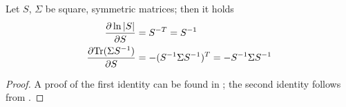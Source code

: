 \begin{lemma}
  Let $S$, $\Sigma$ be square, symmetric matrices; then it holds
  \begin{align}
    \frac{\partial \ln |S|}{\partial S} &= S^{-T} = S^{-1}\\
    \frac{\partial \mathrm{Tr}(\Sigma S^{-1})}{\partial S} &= - (S^{-1} \Sigma S^{-1})^T = - S^{-1} \Sigma S^{-1}
  \end{align}
\end{lemma}

\begin{proof}
  A proof of the first identity can be found in \cite[Section~8.3, Theorem~1]{MagnusNeudecker:1999}; the second identity follows from \cite[Section~8.2; Section~8.4, Theorem~3]{MagnusNeudecker:1999}.
\end{proof}

